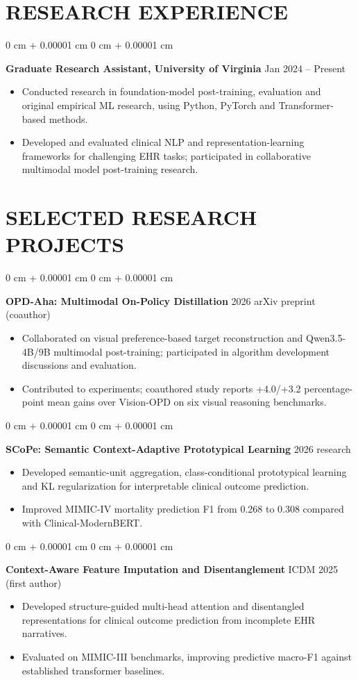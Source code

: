 \documentclass[10pt, letterpaper]{article}
\newenvironment{highlights}{
    \begin{itemize}[
        topsep=0.03 cm,
        parsep=0.03 cm,
        partopsep=0pt,
        itemsep=0pt,
        leftmargin=0 cm + 10pt
    ]
}{
    \end{itemize}
} %
\newenvironment{onecolentry}{
    \begin{adjustwidth}{
        0 cm + 0.00001 cm
    }{
        0 cm + 0.00001 cm
    }
}{
    \end{adjustwidth}
} %
\begin{document}
\section{RESEARCH EXPERIENCE}
\begin{onecolentry}
\textbf{Graduate Research Assistant, University of Virginia} \hfill Jan 2024 -- Present
\begin{highlights}
\item Conducted research in foundation-model post-training, evaluation and original empirical ML research, using Python, PyTorch and Transformer-based methods.
\item Developed and evaluated clinical NLP and representation-learning frameworks for challenging EHR tasks; participated in collaborative multimodal model post-training research.
\end{highlights}
\end{onecolentry}
\section{SELECTED RESEARCH PROJECTS}
\begin{onecolentry}
\textbf{OPD-Aha: Multimodal On-Policy Distillation} \hfill 2026 arXiv preprint (coauthor)
\begin{highlights}
\item Collaborated on visual preference-based target reconstruction and Qwen3.5-4B/9B multimodal post-training; participated in algorithm development discussions and evaluation.
\item Contributed to experiments; coauthored study reports +4.0/+3.2 percentage-point mean gains over Vision-OPD on six visual reasoning benchmarks.
\end{highlights}
\end{onecolentry}
\vspace{0.025 cm}
\begin{onecolentry}
\textbf{SCoPe: Semantic Context-Adaptive Prototypical Learning} \hfill 2026 research
\begin{highlights}
\item Developed semantic-unit aggregation, class-conditional prototypical learning and KL regularization for interpretable clinical outcome prediction.
\item Improved MIMIC-IV mortality prediction F1 from 0.268 to 0.308 compared with Clinical-ModernBERT.
\end{highlights}
\end{onecolentry}
\vspace{0.025 cm}
\begin{onecolentry}
\textbf{Context-Aware Feature Imputation and Disentanglement} \hfill ICDM 2025 (first author)
\begin{highlights}
\item Developed structure-guided multi-head attention and disentangled representations for clinical outcome prediction from incomplete EHR narratives.
\item Evaluated on MIMIC-III benchmarks, improving predictive macro-F1 against established transformer baselines.
\end{highlights}
\end{onecolentry}
\vspace{0.025 cm}
\end{document}
